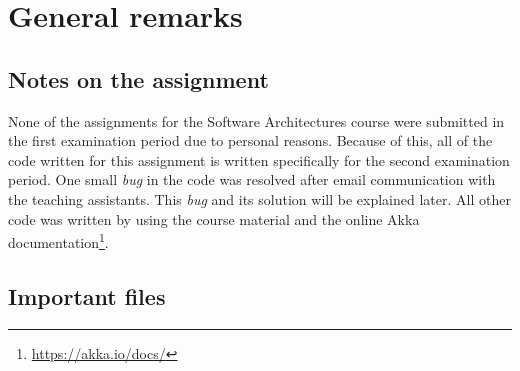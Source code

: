 \chapter{General remarks}
\label{ch:general_remarks}


\section{Notes on the assignment}
\label{sec:notes_on_ass}

None of the assignments for the Software Architectures course were submitted in the first examination period due to personal reasons.
Because of this, all of the code written for this assignment is written specifically for the second examination period.
One small \textit{bug} in the code was resolved after email communication with the teaching assistants.
This \textit{bug} and its solution will be explained later.
All other code was written by using the course material and the online Akka documentation\footnote{\url{https://akka.io/docs/}}.


\section{Important files}
\label{sec:important_files}

